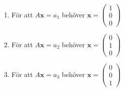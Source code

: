 \begin{enumerate}[label= Fall $a_{\arabic*}$:]
    \item För att $A\bm{x}=a_{1}$ behöver $\bm{x}=\begin{pmatrix}
        1\\0\\0
    \end{pmatrix}$
    \item För att $A\bm{x}=a_{2}$ behöver $\bm{x}=\begin{pmatrix}
        0\\1\\0
    \end{pmatrix}$
    \item För att $A\bm{x}=a_{3}$ behöver $\bm{x}=\begin{pmatrix}
        0\\0\\1
    \end{pmatrix}$
\end{enumerate}